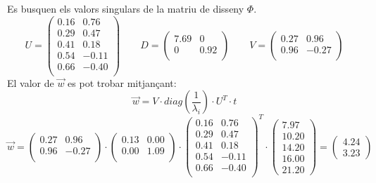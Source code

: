 \documentclass[a4paper]{article}
\begin{document}
Es busquen els valors singulars de la matriu de disseny $\Phi$.
$$
U = 
\begin{pmatrix}
0.16 & 0.76 \\
0.29 & 0.47 \\
0.41 & 0.18 \\
0.54 & -0.11 \\
0.66 & -0.40 \\
\end{pmatrix}
\qquad
D =
\begin{pmatrix}
7.69 & 0 \\
0 & 0.92 \\
\end{pmatrix}
\qquad
V = 
\begin{pmatrix}
0.27 & 0.96 \\
0.96 & -0.27 \\
\end{pmatrix}
$$
El valor de $\vec{w}$ es pot trobar mitjançant:
$$
\vec{w} = V·diag\left(\frac{1}{\lambda_i}\right)·U^T·t
$$
$$
\vec{w} = 
\begin{pmatrix}
0.27 & 0.96 \\
0.96 & -0.27 \\
\end{pmatrix}
·
\begin{pmatrix}
0.13 & 0.00 \\
0.00 & 1.09 \\
\end{pmatrix}
·
\begin{pmatrix}
0.16 & 0.76 \\
0.29 & 0.47 \\
0.41 & 0.18 \\
0.54 & -0.11 \\
0.66 & -0.40 \\
\end{pmatrix}^T
·
\begin{pmatrix}
7.97 \\
10.20 \\
14.20 \\
16.00 \\
21.20
\end{pmatrix}
= 
\begin{pmatrix}
4.24 \\
3.23
\end{pmatrix}
$$
\end{document}
